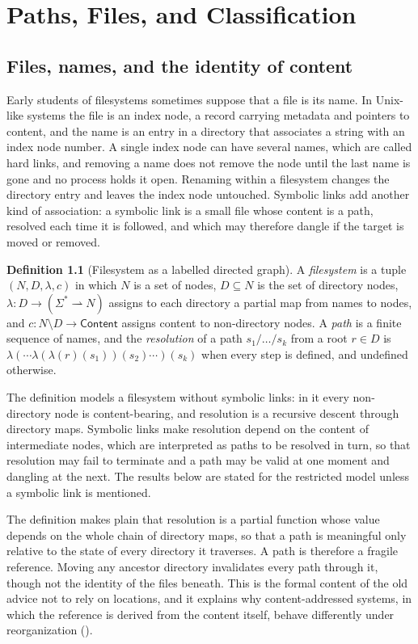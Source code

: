\documentclass[11pt,twoside,openright]{book}
\theoremstyle{plain}
\theoremstyle{definition}
\newtheorem{definition}[theorem]{Definition}
\theoremstyle{remark}
\begin{document}
\chapter{Paths, Files, and Classification}\label{ch:paths}

\section{Files, names, and the identity of content}

Early students of filesystems sometimes suppose that a file is its name. In Unix-like systems the file is an index node, a record carrying metadata and pointers to content, and the name is an entry in a directory that associates a string with an index node number. A single index node can have several names, which are called hard links, and removing a name does not remove the node until the last name is gone and no process holds it open. Renaming within a filesystem changes the directory entry and leaves the index node untouched. Symbolic links add another kind of association: a symbolic link is a small file whose content is a path, resolved each time it is followed, and which may therefore dangle if the target is moved or removed.

\begin{definition}[Filesystem as a labelled directed graph]\label{def:fs}
A \emph{filesystem} is a tuple $(N,D,\lambda,c)$ in which $N$ is a set of nodes, $D\subseteq N$ is the set of directory nodes, $\lambda:D\to(\Sigma^*\rightharpoonup N)$ assigns to each directory a partial map from names to nodes, and $c:N\setminus D\to\mathsf{Content}$ assigns content to non-directory nodes. A \emph{path} is a finite sequence of names, and the \emph{resolution} of a path $s_1/\dots/s_k$ from a root $r\in D$ is $\lambda(\cdots\lambda(\lambda(r)(s_1))(s_2)\cdots)(s_k)$ when every step is defined, and undefined otherwise.
\end{definition}

The definition models a filesystem without symbolic links: in it every non-directory node is content-bearing, and resolution is a recursive descent through directory maps. Symbolic links make resolution depend on the content of intermediate nodes, which are interpreted as paths to be resolved in turn, so that resolution may fail to terminate and a path may be valid at one moment and dangling at the next. The results below are stated for the restricted model unless a symbolic link is mentioned.

The definition makes plain that resolution is a partial function whose value depends on the whole chain of directory maps, so that a path is meaningful only relative to the state of every directory it traverses. A path is therefore a fragile reference. Moving any ancestor directory invalidates every path through it, though not the identity of the files beneath. This is the formal content of the old advice not to rely on locations, and it explains why content-addressed systems, in which the reference is derived from the content itself, behave differently under reorganization ().
\end{document}
